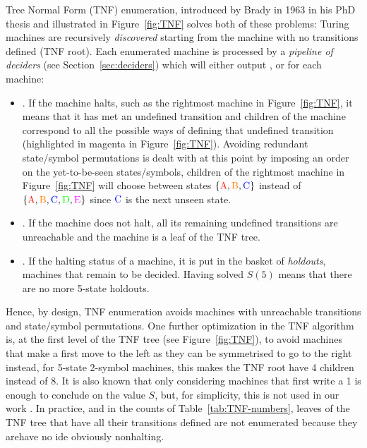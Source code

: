 Tree Normal Form (TNF) enumeration, introduced by Brady in 1963 in his PhD thesis \cite{Brady64} and illustrated in Figure~\ref{fig:TNF} solves both of these problems: Turing machines are recursively \textit{discovered} starting from the machine with no transitions defined (TNF root). Each enumerated machine is processed by a \textit{pipeline of deciders} (see Section~\ref{sec:deciders}) which will either output \HALT, \NONHALT or \UNKNOWN for each machine:
\begin{itemize}
    \item \HALT. If the machine halts, such as the rightmost machine in Figure~\ref{fig:TNF}, it means that it has met an undefined transition and children of the machine correspond to all the possible ways of defining that undefined transition (highlighted in magenta in Figure~\ref{fig:TNF}). Avoiding redundant state/symbol permutations is dealt with at this point by imposing an order on the yet-to-be-seen states/symbols, \eg children of the rightmost machine in Figure~\ref{fig:TNF} will choose between states $\{\text{\stateA},\text{\stateB},\text{\stateC}\}$ instead of $\{\text{\stateA},\text{\stateB},\text{\stateC},\text{\stateD},\text{\stateE}\}$ since $\text{\stateC}$ is the next unseen state.
    \item \NONHALT. If the machine does not halt, all its remaining undefined transitions are unreachable and the machine is a leaf of the TNF tree.
    \item \UNKNOWN. If the halting status of a machine, it is put in the basket of \textit{holdouts}, \ie machines that remain to be decided. Having solved $S(5)$ means that there are no more 5-state holdouts.
\end{itemize}

Hence, by design, TNF enumeration avoids machines with unreachable transitions and state/symbol permutations. One further optimization in the TNF algorithm is,
at the first level of the TNF tree (see Figure~\ref{fig:TNF}), to avoid machines that make a first move to the left as they can be symmetrised to go to the right instead, \eg for 5-state 2-symbol machines, this makes the TNF root have 4 children instead of 8. It is also known that only considering machines that first write a 1 is enough to conclude on the value $S$, but, for simplicity, this is not used in our work \cite{Marxen_1990,busycoq}. In practice, and in the counts of Table~\ref{tab:TNF-numbers}, leaves of the TNF tree that have all their transitions defined are not enumerated because they arehave no ide obviously nonhalting.


